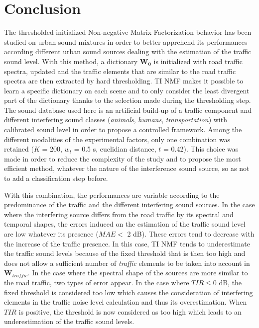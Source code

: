 \documentclass[12pt,english,twoside]{article}
\begin{document}
\section{Conclusion}

The thresholded initialized Non-negative Matrix Factorization behavior has been studied on urban sound mixtures in order to better apprehend its performances according different urban sound sources dealing with the estimation of the traffic sound level.
With this method, a dictionary $\mathbf{W_0}$ is initialized
with road traffic spectra, updated and the traffic
elements that are similar to the road traffic spectra are then extracted by hard thresholding. 
TI NMF makes it possible to learn a specific dictionary on each scene and to only consider the least divergent part of the dictionary thanks to the selection made during the thresholding step.
The sound database used here is an artificial build-up of a traffic component and different interfering sound classes (\textit{animals}, \textit{humans}, \textit{transportation}) with calibrated sound level in order to propose a controlled framework.
Among the different modalities of the experimental factors, only one combination was retained ($K$ = 200, $w_t$ = 0.5 s, euclidian distance, $t$ = 0.42). This choice was made in order to reduce the complexity of the study and to propose the most efficient method, whatever the nature of the interference sound source, so as not to add a classification step before.

With this combination, the performances are variable according to the predominance of the traffic and the different interfering sound sources. In the case where the interfering source differs from the road traffic by its spectral and temporal shapes, the errors induced on the estimation of the traffic sound level are low whatever its presence ($MAE <$ 2 dB). These errors tend to decrease with the increase of the traffic presence. In this case, TI NMF tends to underestimate the traffic sound levels because of the fixed threshold that is then too high and does not allow a sufficient number of \textit{traffic} elements to be taken into account in $\mathbf{W}_{traffic}$.
In the case where the spectral shape of the sources are more similar to the road traffic, two types of error appear. In the case where $TIR \leq 0$ dB, the fixed threshold is considered too low which causes the consideration of interfering elements in the  traffic noise level calculation and thus its overestimation. When $TIR$ is positive, the threshold is now considered as too high which leads to an underestimation of the traffic sound levels.
\end{document}
